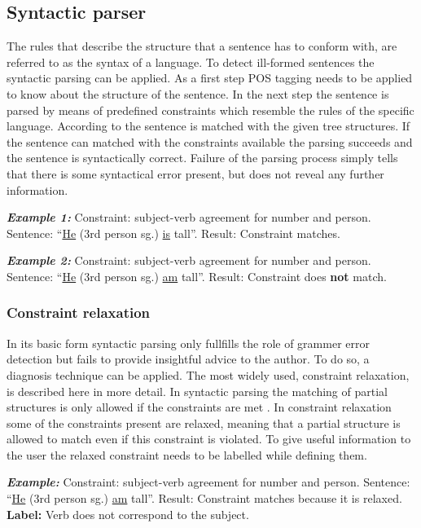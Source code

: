\documentclass[runningheads]{llncs}
\begin{document}
\subsection{Syntactic parser}   
The rules that describe the structure that a sentence has to conform with, are referred to as the syntax of a language. To detect ill-formed sentences the syntactic parsing can be applied. As a first step POS tagging needs to be applied to know about the structure of the sentence. In the next step the sentence is parsed by means of predefined constraints which resemble the rules of the specific language. According to \textcite{manchanda_various_2016} the sentence is matched with the given tree structures. If the sentence can matched with the constraints available the parsing succeeds and the sentence is syntactically correct. Failure of the parsing process simply tells that there is some syntactical error present, but does not reveal any further information.

\textbf{\textit{Example 1:}} Constraint: subject-verb agreement for number and person. Sentence: ``\underline{He} (3rd person sg.) \underline{is} tall''. Result: Constraint matches.

\textbf{\textit{Example 2:}} Constraint: subject-verb agreement for number and person. Sentence: ``\underline{He} (3rd person sg.) \underline{am} tall''. Result: Constraint does \textbf{not} match.

\subsubsection{Constraint relaxation}
In its basic form syntactic parsing only fullfills the role of grammer error detection but fails to provide insightful advice to the author. To do so, a diagnosis technique can be applied. The most widely used, constraint relaxation, is described here in more detail. In syntactic parsing the matching of partial structures is only allowed if the constraints are met \citep{vandeventer_creating_2001}. In constraint relaxation some of the constraints present are relaxed, meaning that a partial structure is allowed to match even if this constraint is violated. To give useful information to the user the relaxed constraint needs to be labelled while defining them. 

\textbf{\textit{Example:}} Constraint: subject-verb agreement for number and person. Sentence: ``\underline{He} (3rd person sg.) \underline{am} tall''. Result: Constraint matches because it is relaxed. \textbf{Label:} Verb does not correspond to the subject.
\end{document}
